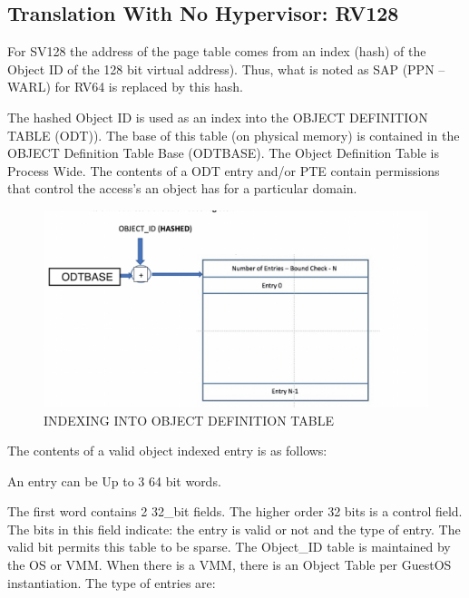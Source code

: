 \documentclass{article}
\begin{document}
\subsection{Translation With No Hypervisor: RV128}

For SV128 the address of the page table comes from an index (hash) of the Object ID of the  128 bit virtual address).  Thus, what is noted as SAP (PPN – WARL) for RV64 is replaced by this  hash. 

The hashed Object ID is used as an index into the OBJECT DEFINITION TABLE (ODT)).  The base of this table (on physical memory) is contained in the OBJECT Definition Table Base (ODTBASE). The Object Definition Table is Process Wide. The contents of a ODT entry and/or PTE contain permissions that control the access's an object has for a particular domain.

         
\begin{figure}
\includegraphics[scale=.4]{figures/figure4a_datt_translation_table.jpg}
\caption{INDEXING INTO OBJECT DEFINITION TABLE}
\end{figure}

The contents of a valid object indexed entry is as follows:

An entry can be Up to 3 64 bit words.  

The first word  contains 2 32\_bit fields.  The higher order 32 bits is a control field.   The bits in this field indicate:  the entry is valid or not and the type of  entry. The valid bit permits this table to be sparse.  The Object\_ID table is maintained by the OS or VMM.  When there is a VMM,  there is an Object Table per GuestOS instantiation.  The type of entries are:
\end{document}
